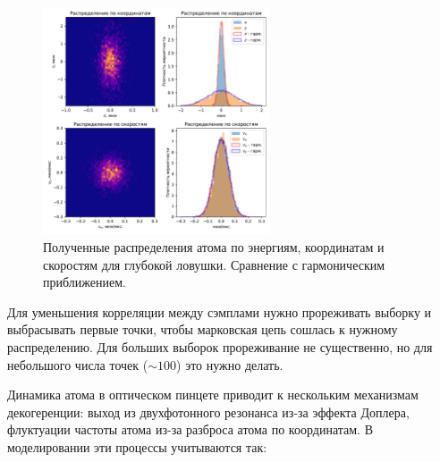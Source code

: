 \begin{figure}[H]
	\centering
	\includegraphics[width=0.6\textwidth]{images/mcmc.pdf}
	\caption{Полученные распределения атома по энергиям, координатам и скоростям для глубокой ловушки. Сравнение с гармоническим приближением.}
	\label{fig:mcmc_samples}
\end{figure}

Для уменьшения корреляции между сэмплами нужно прореживать выборку и выбрасывать первые точки, чтобы марковская цепь сошлась к нужному распределению. Для больших выборок прореживание не существенно, но для небольшого числа точек ($\sim 100$) это нужно делать.

Динамика атома в оптическом пинцете приводит к нескольким механизмам декогеренции: выход из двухфотонного резонанса из-за эффекта Доплера, флуктуации частоты атома из-за разброса атома по координатам. В моделировании эти процессы учитываются так:

